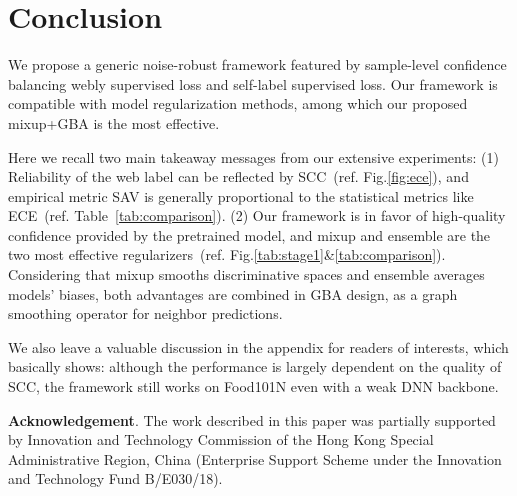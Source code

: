 \documentclass[runningheads]{llncs}
\begin{document}
\section{Conclusion}
We propose a generic noise-robust framework featured by sample-level confidence balancing webly supervised loss and self-label supervised loss. Our framework is compatible with model regularization methods, among which our proposed mixup+GBA is the most effective. 

Here we recall two main takeaway messages from our extensive experiments:
(1) Reliability of the web label can be reflected by SCC~(ref. Fig.\ref{fig:ece}), and empirical metric SAV is generally proportional to the statistical metrics like ECE~(ref. Table~\ref{tab:comparison}).
(2) Our framework is in favor of high-quality confidence provided by the pretrained model, and mixup and ensemble are the two most effective regularizers~(ref. Fig.\ref{tab:stage1}\&\ref{tab:comparison}). Considering that mixup smooths discriminative spaces and ensemble averages models’ biases, both advantages are combined in GBA design, as a graph smoothing operator for neighbor predictions.

We also leave a valuable discussion in the appendix for readers of interests, which basically shows: although the performance is largely dependent on the quality of SCC, the framework still works on Food101N even with a weak DNN backbone.

\bigskip
\noindent\textbf{Acknowledgement}. 
The work described in this paper was partially supported by Innovation and Technology Commission of the Hong Kong Special Administrative Region, China (Enterprise Support Scheme under the Innovation and Technology Fund B/E030/18).
	
\clearpage


\end{document}

